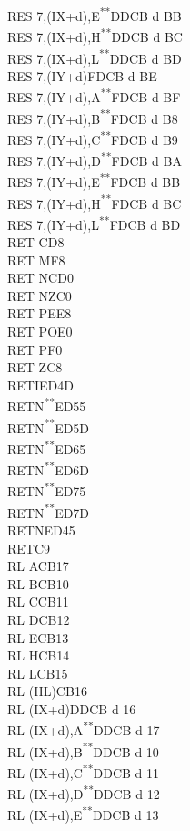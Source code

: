 \documentclass[12pt,twoside,openright,a4paper]{book}
\newcommand{\UNDOC}{\textnormal{\textsuperscript{**}}}
\begin{document}
\begin{multicols}{3}
{\begin{tabbing}
		RES 7,(IX+d),E\UNDOC\>DDCB d BB\\
		RES 7,(IX+d),H\UNDOC\>DDCB d BC\\
		RES 7,(IX+d),L\UNDOC\>DDCB d BD\\
		RES 7,(IY+d)\>FDCB d BE\\
		RES 7,(IY+d),A\UNDOC\>FDCB d BF\\
		RES 7,(IY+d),B\UNDOC\>FDCB d B8\\
		RES 7,(IY+d),C\UNDOC\>FDCB d B9\\
		RES 7,(IY+d),D\UNDOC\>FDCB d BA\\
		RES 7,(IY+d),E\UNDOC\>FDCB d BB\\
		RES 7,(IY+d),H\UNDOC\>FDCB d BC\\
		RES 7,(IY+d),L\UNDOC\>FDCB d BD\\
		RET C\>D8\\
		RET M\>F8\\
		RET NC\>D0\\
		RET NZ\>C0\\
		RET PE\>E8\\
		RET PO\>E0\\
		RET P\>F0\\
		RET Z\>C8\\
		RETI\>ED4D\\
		RETN\UNDOC\>ED55\\
		RETN\UNDOC\>ED5D\\
		RETN\UNDOC\>ED65\\
		RETN\UNDOC\>ED6D\\
		RETN\UNDOC\>ED75\\
		RETN\UNDOC\>ED7D\\
		RETN\>ED45\\
		RET\>C9\\
		RL A\>CB17\\
		RL B\>CB10\\
		RL C\>CB11\\
		RL D\>CB12\\
		RL E\>CB13\\
		RL H\>CB14\\
		RL L\>CB15\\
		RL (HL)\>CB16\\
		RL (IX+d)\>DDCB d 16\\
		RL (IX+d),A\UNDOC\>DDCB d 17\\
		RL (IX+d),B\UNDOC\>DDCB d 10\\
		RL (IX+d),C\UNDOC\>DDCB d 11\\
		RL (IX+d),D\UNDOC\>DDCB d 12\\
		RL (IX+d),E\UNDOC\>DDCB d 13\\

\end{tabbing}}
\end{multicols}
\end{document}
